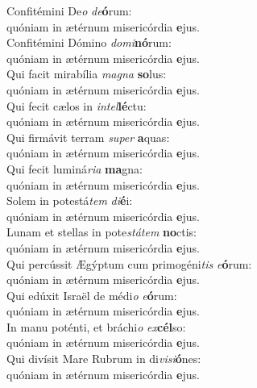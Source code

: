 \evenverse Confitémini De\textit{o} \textit{de}\textbf{ó}rum:~\*\\
\evenverse quóniam in ætérnum misericórdia \textbf{e}jus.\\
\oddverse Confitémini Dómino \textit{do}\textit{mi}\textbf{nó}rum:~\*\\
\oddverse quóniam in ætérnum misericórdia \textbf{e}jus.\\
\evenverse Qui facit mirabília \textit{ma}\textit{gna} \textbf{so}lus:~\*\\
\evenverse quóniam in ætérnum misericórdia \textbf{e}jus.\\
\oddverse Qui fecit cælos in \textit{in}\textit{tel}\textbf{lé}ctu:~\*\\
\oddverse quóniam in ætérnum misericórdia \textbf{e}jus.\\
\evenverse Qui firmávit terram \textit{su}\textit{per} \textbf{a}quas:~\*\\
\evenverse quóniam in ætérnum misericórdia \textbf{e}jus.\\
\oddverse Qui fecit luminá\textit{ri}\textit{a} \textbf{ma}gna:~\*\\
\oddverse quóniam in ætérnum misericórdia \textbf{e}jus.\\
\evenverse Solem in potestá\textit{tem} \textit{di}\textbf{é}i:~\*\\
\evenverse quóniam in ætérnum misericórdia \textbf{e}jus.\\
\oddverse Lunam et stellas in pote\textit{stá}\textit{tem} \textbf{no}ctis:~\*\\
\oddverse quóniam in ætérnum misericórdia \textbf{e}jus.\\
\evenverse Qui percússit Ægýptum cum primogéni\textit{tis} \textit{e}\textbf{ó}rum:~\*\\
\evenverse quóniam in ætérnum misericórdia \textbf{e}jus.\\
\oddverse Qui edúxit Israël de médi\textit{o} \textit{e}\textbf{ó}rum:~\*\\
\oddverse quóniam in ætérnum misericórdia \textbf{e}jus.\\
\evenverse In manu poténti, et bráchi\textit{o} \textit{ex}\textbf{cél}so:~\*\\
\evenverse quóniam in ætérnum misericórdia \textbf{e}jus.\\
\oddverse Qui divísit Mare Rubrum in di\textit{vi}\textit{si}\textbf{ó}nes:~\*\\
\oddverse quóniam in ætérnum misericórdia \textbf{e}jus.\\
